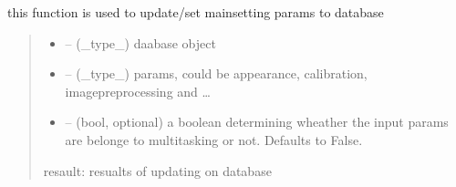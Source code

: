 \documentclass[letterpaper,10pt,english]{sphinxmanual}
\begin{document}
\begin{savenotes}\begin{fulllineitems}
\label{\detokenize{setting/backend/mainsetting_funcs:oxin.backend.mainsetting_funcs.set_mainsetting_params_to_db}}
\pysigstartsignatures
{}
\pysigstopsignatures
\sphinxAtStartPar
this function is used to update/set mainsetting params to database
\begin{quote}\begin{description}
\begin{itemize}
\item {} 
\sphinxAtStartPar
{} – (\_type\_) daabase object

\item {} 
\sphinxAtStartPar
{} – (\_type\_) params, could be appearance, calibration, image\sphinxhyphen{}preprocessing and …

\item {} 
\sphinxAtStartPar
{} – (bool, optional) a boolean determining wheather the input params are belonge to multitasking or not. Defaults to False.

\end{itemize}

\sphinxAtStartPar
resault: resualts of updating on database

\end{description}\end{quote}

\end{fulllineitems}\end{savenotes}

\end{document}
